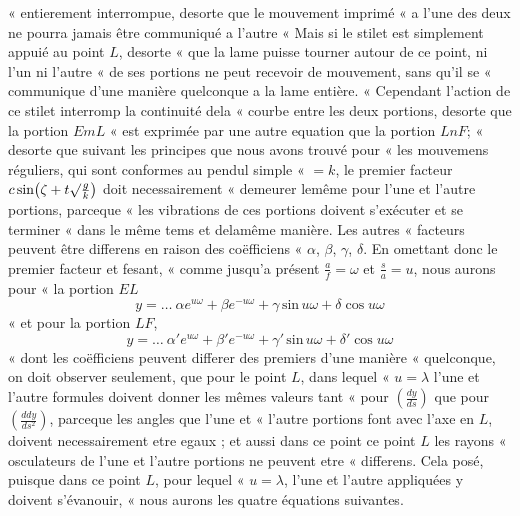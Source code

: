 \documentclass[11pt,a4paper]{article}
\begin{document}
« entierement interrompue, desorte que le mouvement imprimé « a l'une des
deux ne pourra jamais être communiqué a l'autre « Mais si le stilet est
simplement appuié au point $L$, desorte « que la lame puisse tourner autour
de ce point, ni l'un ni l'autre « de ses portions ne peut recevoir de
mouvement, sans qu'il se « communique d'une manière quelconque a la lame
entière. « Cependant l'action de ce stilet interromp la continuité dela
« courbe entre les deux portions, desorte que la portion $EmL$ « est exprimée
par une autre equation que la portion $LnF$; « desorte que suivant les
principes que nous avons trouvé pour « les mouvemens réguliers, qui sont
conformes au pendul simple « $=k$, le premier facteur
$c\,\text{sin}\big(\zeta+t\surd\frac{g}{k}\big)$ doit necessairement « demeurer
lemême pour l'une et l'autre portions, parceque « les vibrations de ces
portions doivent s'exécuter et se terminer « dans le même tems et delamême
manière. Les autres « facteurs peuvent être differens en raison des
coëfficiens « $\alpha$, $\beta$, $\gamma$, $\delta$. En omettant donc le
premier facteur et fesant, « comme jusqu'a présent $\frac{a}{f}=\omega$ et
$\frac{s}{a}=u$, nous aurons pour « la portion $EL$
\[ y=\ldots\ \alpha e^{u\omega}+\beta e^{-u\omega}+\gamma\,\text{sin}\,u\omega+\delta\cos u\omega \]
« et pour la portion $LF$,
\[ y=\ldots\ \alpha' e^{u\omega}+\beta' e^{-u\omega}+\gamma'\,\text{sin}\,u\omega+\delta'\cos u\omega \]
« dont les coëfficiens peuvent differer des premiers d'une manière
« quelconque, on doit observer seulement, que pour le point $L$, dans lequel
« $u=\lambda$ l'une et l'autre formules doivent donner les mêmes valeurs tant
« pour $\left(\frac{dy}{ds}\right)$ que pour $\left(\frac{ddy}{ds^2}\right)$,
parceque les angles que l'une et « l'autre portions font avec l'axe en $L$,
doivent necessairement etre egaux ; et aussi dans ce point ce point $L$ les
rayons « osculateurs de l'une et l'autre portions ne peuvent etre
« differens. Cela posé, puisque dans ce point $L$, pour lequel « $u=\lambda$,
l'une et l'autre appliquées y doivent s'évanouir, « nous aurons les quatre
équations suivantes.
\end{document}
